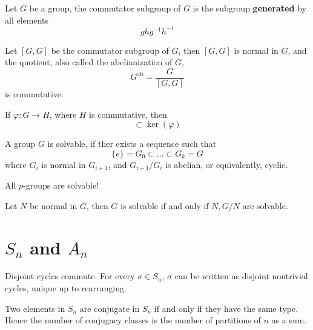 \documentclass[openany]{book}
\begin{document}
\begin{defn}
    Let $G$ be a group, the commutator subgroup of $G$ is the subgroup \textbf{generated} by all elements 
    \begin{equation*}
        ghg^{-1}h^{-1}
    \end{equation*}
\end{defn}


\begin{prop}
    Let $[G,G]$ be the commutator subgroup of $G$, then $[G,G]$ is normal in $G$, and the quotient, also called the abelianization of $G$, 
    \begin{equation*}
        G^{\text{ab}}=\frac{G}{[G,G]}
    \end{equation*}
    is commutative.

    If $\varphi: G\to H$, where $H$ is commutative, then 
    \begin{equation*}
        [G,G]\subset\ker(\varphi)
    \end{equation*}
\end{prop}
\begin{defn}
    A group $G$ is solvable, if ther exists a sequence such that 
    \begin{equation*}
        \{e\}=G_0\subset\dots\subset G_k=G
    \end{equation*}
    where $G_i$ is normal in $G_{i+1}$, and $G_{i+1}/G_i$ is abelian, or equivalently, cyclic.
\end{defn}




\begin{prop}
    All $p$-groups are solvable!
\end{prop}

\begin{prop}
    Let $N$ be normal in $G$, then $G$ is solvable if and only if $N, G/N$ are solvable.
\end{prop}


\section{$S_n$ and $A_n$}

\begin{prop}
    Disjoint cycles commute. For every $\sigma\in S_n$, $\sigma$ can be written as disjoint nontrivial cycles, unique up to rearranging.
\end{prop}

\begin{prop}
    Two elements in $S_n$ are conjugate in $S_n$ if and only if they have the same type. Hence the number of conjugacy classes is the number of partitions of $n$ as a sum.
\end{prop}
\end{document}
